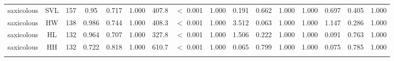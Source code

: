 \begin{longtable}{lccccccccccccccc}
saxicolous & SVL & 157 & 0.95 & 0.717 & 1.000 & 407.8 & $<$ 0.001 & 1.000 & 0.191 & 0.662 & 1.000 & 1.000 & 0.697 & 0.405 & 1.000 \\ 
saxicolous & HW & 138 & 0.986 & 0.744 & 1.000 & 408.3 & $<$ 0.001 & 1.000 & 3.512 & 0.063 & 1.000 & 1.000 & 1.147 & 0.286 & 1.000 \\ 
saxicolous & HL & 132 & 0.964 & 0.707 & 1.000 & 327.8 & $<$ 0.001 & 1.000 & 1.506 & 0.222 & 1.000 & 1.000 & 0.091 & 0.763 & 1.000 \\ 
saxicolous & HH & 132 & 0.722 & 0.818 & 1.000 & 610.7 & $<$ 0.001 & 1.000 & 0.065 & 0.799 & 1.000 & 1.000 & 0.075 & 0.785 & 1.000 \\ 
\hline

\label{table_main_results}
\end{longtable}

